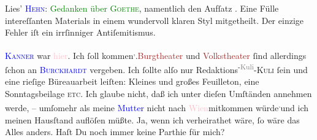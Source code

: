 \pstart
           Lies’ \textsc{\textcolor{blue}{Hehn}{}\ledrightnote{\textcolor{blue}{Victor Hehn}}}: \textcolor{green}{Gedanken über \textsc{Goethe}}{}\ledrightnote{\textcolor{green}{Gedanken über Goethe}}, namentlich den Aufſatz \label{K_L03204-343v}\label{K_L03204-343h}. Eine Fülle
               intereſſanten Materials in einem wundervoll klaren {\pb}Styl mitgetheilt. Der einzige Fehler iſt\strikeout{\textcolor{gray}{,}} ein irrſinniger Antiſemitismus.\pend
           
\pstart
           \textsc{\textcolor{blue}{Kanner}{}\ledrightnote{\textcolor{blue}{Heinrich Kanner}}} war \textcolor{pink}{hier}{}\ledrightnote{{$\rightarrow$}\textcolor{pink}{Berlin}}. Ich ſoll
                  \label{K_L03204-777v}\label{K_L03204-777h} kommen\substVorne{}\textsuperscript{,}\substDazwischen{}.\substHinten{}{ }\textcolor{brown}{Burgtheater}{}\ledrightnote{\textcolor{brown}{Burgtheater}} und \textcolor{brown}{Volkstheater}{}\ledrightnote{\textcolor{brown}{Volkstheater}} ſind allerdings ſchon an \textsc{\textcolor{blue}{Burckhardt}{}\ledrightnote{\textcolor{blue}{Max Eugen Burckhard}}} vergeben. Ich ſollte alſo nur Redaktions\substVorne{}\textsuperscript{-\textcolor{gray}{Kuli}}\substDazwischen{}-\textsc{Kuli}\substHinten{} ſein und eine rieſige Büreauarbeit leiſten: Kleines und großes Feuilleton,
               eine Sonntagsbeilage \textsc{etc}. Ich glaube nicht, daß ich unter
               dieſen Umſtänden annehmen werde, – umſomehr als meine \textcolor{blue}{Mutter}{}\ledrightnote{{$\rightarrow$}\textcolor{blue}{Clementine Goldmann}} nicht nach \textcolor{pink}{Wien}{}\ledrightnote{\textcolor{pink}{Wien}}{ }{\pb}mitkommen würde\substVorne{}\textsuperscript{.}\substDazwischen{}{ }und ich meinen Hausſtand auflöſen müßte.\substHinten{} Ja, wenn ich verheirathet wäre, ſo wäre das Alles anders. Haſt Du noch immer
               keine Parthie für mich?\pend
           
